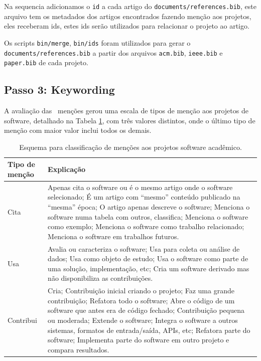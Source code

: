 Na sequencia adicionamos o \texttt{id} a cada artigo do
\texttt{documents/references.bib}, este arquivo tem os metadados dos artigos
encontrados fazendo menção aos projetos, eles receberam ids, estes ids serão
utilizados para relacionar o projeto ao artigo.

Os scripts \texttt{bin/merge}, \texttt{bin/ids} foram utilizados para gerar o
\texttt{documents/references.bib} a partir dos arquivos \texttt{acm.bib},
\texttt{ieee.bib} e \texttt{paper.bib} de cada projeto.


\subsection{Passo 3: Keywording}

A avaliação das \ScreeningCount \ menções gerou uma escala de tipos de menção
aos projetos de software, detalhado na Tabela \ref{esquema-de-mencao}, com três valores
distintos, onde o último tipo de menção com maior valor inclui todos os demais.

\begin{table}[h]
\caption{Esquema para classificação de menções aos projetos software acadêmico.}
\centering
\begin{tabular}{ l p{10cm} }
  \hline
  Tipo de menção           & Explicação \\
  \hline
  Cita      & Apenas cita o software ou é o mesmo artigo onde o software selecionado; É um artigo com ``mesmo'' conteúdo publicado na ``mesma'' época; O artigo apenas descreve o software; Menciona o software numa tabela com outros, classifica; Menciona o software como exemplo; Menciona o software como trabalho relacionado; Menciona o software em trabalhos futuros. \\
  Usa       & Avalia ou caracteriza o software; Usa para coleta ou análise de dados; Usa como objeto de estudo; Usa o software como parte de uma solução, implementação, etc; Cria um software derivado mas não disponibiliza as contribuições. \\
  Contribui & Cria; Contribuição inicial criando o projeto; Faz uma grande contribuição; Refatora todo o software; Abre o código de um software que antes era de código fechado; Contribuição pequena ou moderada; Extende o software; Integra o software a outros sistemas, formatos de entrada/saída, APIs, etc; Refatora parte do software; Implementa parte do software em outro projeto e compara resultados. \\
  \hline
\end{tabular}
\label{esquema-de-mencao}
\end{table}


